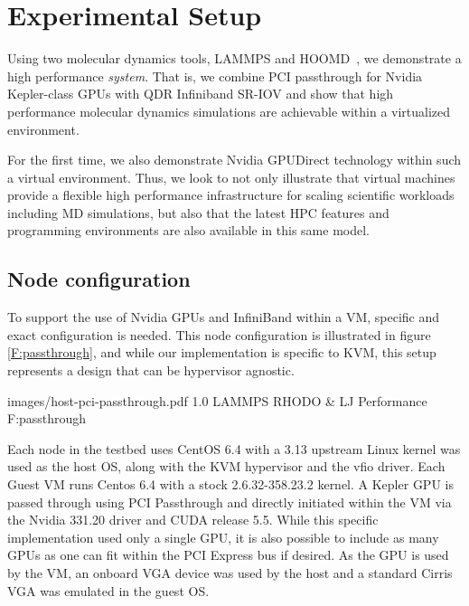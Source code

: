 \documentclass[times,10pt,twocolumn,conference]{IEEEtran}
\begin{document}



\section{Experimental Setup}

Using two molecular dynamics tools, LAMMPS\cite{plimpton2007lammps} and HOOMD~\cite{anderson2010hoomd}, we demonstrate a high performance \textit{system}.  That is, we combine PCI passthrough for Nvidia Kepler-class GPUs with QDR Infiniband SR-IOV and show that high performance molecular dynamics simulations are achievable within a virtualized environment. 

For the first time, we also demonstrate Nvidia GPUDirect technology within such a virtual environment.  Thus, we look to not only illustrate that virtual machines provide a flexible high performance infrastructure for scaling scientific workloads including MD simulations, but also that the latest HPC features and programming environments are also available in this same model.   

\subsection{Node configuration}

To support the use of Nvidia GPUs and InfiniBand within a VM, specific and exact configuration is needed. This node configuration is illustrated in figure \ref{F:passthrough}, and while our implementation is specific to KVM, this setup represents a design that can be hypervisor agnostic.

  {images/host-pci-passthrough.pdf}
  {1.0}
  {LAMMPS RHODO \& LJ Performance}
  {F:passthrough}


Each node in the testbed uses CentOS 6.4 with a 3.13 upstream Linux kernel was used as the host OS, along with the KVM hypervisor and the vfio driver. 
Each Guest VM runs Centos 6.4 with a stock 2.6.32-358.23.2 kernel.
A Kepler GPU is passed through using PCI Passthrough and directly initiated within the VM via the Nvidia 331.20 driver and CUDA release 5.5. While this specific implementation used only a single GPU, it is also possible to include as many GPUs as one can fit within the PCI Express bus if desired. As the GPU is used by the VM, an onboard VGA device was used by the host and a standard Cirris VGA was emulated in the guest OS. 
\end{document}
